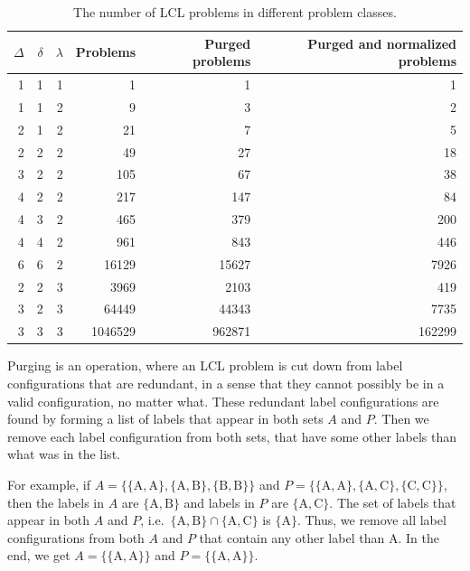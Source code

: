 \begin{table}[H]
  \centering
  \begin{tabular}{rrrrrr}
    \toprule
    $\Delta$ & $\delta$ & $\lambda$ & Problems & Purged problems & Purged and normalized problems\\
    \midrule
    1 & 1 & 1 & 1 & 1 & 1 \\
    \midrule
    1 & 1 & 2 & 9 & 3 & 2 \\
    2 & 1 & 2 & 21 & 7 & 5 \\
    2 & 2 & 2 & 49 & 27 & 18 \\
    3 & 2 & 2 & 105 & 67 & 38 \\
    4 & 2 & 2 & 217 & 147 & 84 \\
    4 & 3 & 2 & 465 & 379 & 200 \\
    4 & 4 & 2 & 961 & 843 & 446 \\
    6 & 6 & 2 & 16129 & 15627 & 7926 \\
    \midrule
    2 & 2 & 3 & 3969 & 2103 & 419 \\
    3 & 2 & 3 & 64449 & 44343 & 7735 \\
    3 & 3 & 3 & 1046529 & 962871 & 162299 \\
    \bottomrule
  \end{tabular}
  \caption{%
    The number of LCL problems in different problem classes.
  }
  \label{tbl:lcl_problem_classes}
\end{table}

Purging is an operation, where an LCL problem is cut down from label configurations that are redundant, in a sense that they cannot possibly be in a valid configuration, no matter what.
These redundant label configurations are found by forming a list of labels that appear in both sets $A$ and $P$.
Then we remove each label configuration from both sets, that have some other labels than what was in the list.

For example, if $A=\{\{\mathrm{A, A}\}, \{\mathrm{A, B}\}, \{\mathrm{B, B}\}\}$ and $P=\{\{\mathrm{A, A}\}, \{\mathrm{A, C}\}, \{\mathrm{C, C}\}\}$, then the labels in $A$ are $\{\mathrm{A, B}\}$ and labels in $P$ are $\{\mathrm{A, C}\}$.
The set of labels that appear in both $A$ and $P$, i.e.\ $\{\mathrm{A, B}\} \cap \{\mathrm{A, C}\} $ is $\{\mathrm{A}\}$.
Thus, we remove all label configurations from both $A$ and $P$ that contain any other label than $\mathrm{A}$.
In the end, we get $A=\{\{\mathrm{A, A}\}\}$ and $P=\{\{\mathrm{A, A}\}\}$.


